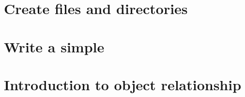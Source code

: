 \documentclass[
]{book}
\begin{document}
\hypertarget{create-files-and-directories}{%
\section{Create files and directories}\label{create-files-and-directories}}

\hypertarget{write-a-simple}{%
\section{Write a simple}\label{write-a-simple}}

\hypertarget{introduction-to-object-relationship}{%
\section{Introduction to object relationship}\label{introduction-to-object-relationship}}

  
\end{document}
